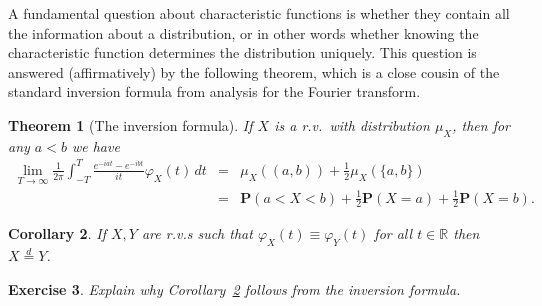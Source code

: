 \documentclass[12pt]{article}
\newtheorem{thm}{Theorem}[section]
\newtheorem{cor}[thm]{Corollary}
\newtheorem{exercise}[thm]{Exercise}
\newcommand{\R}{\mathbb{R}}
\newcommand{\prob}{\mathbf{P}}
\newcommand{\eqdist}{\stackrel{d}{=}}
\theoremstyle{example}
\begin{document}
A fundamental question about characteristic functions is whether they contain all the information about a distribution, or in other words whether knowing the characteristic function determines the distribution uniquely. This question is answered (affirmatively) by the following theorem, which is a close cousin of the standard inversion formula from analysis for the Fourier transform.

\begin{thm}[The inversion formula] \label{thm-inversion}
If $X$ is a r.v.\ with distribution $\mu_X$, then for any $a<b$ we have
\begin{eqnarray*} \lim_{T\to\infty} \frac{1}{2\pi} \int_{-T}^T \frac{e^{-iat}-e^{-ibt}}{it}\varphi_X(t)\,dt &=& \mu_X((a,b)) + \frac12 
\mu_X(\{a,b\}) \\ &=& \prob(a<X<b) + \frac12 \prob(X=a)+\frac12 \prob(X=b).
\end{eqnarray*}
\end{thm}

\begin{cor}
\label{cor:charfun-uniqueness}
If $X,Y$ are r.v.s such that $\varphi_X(t)\equiv \varphi_Y(t)$ for all $t\in\R$ then $X \eqdist Y$.
\end{cor}

\begin{exercise}
Explain why Corollary~\ref{cor:charfun-uniqueness} follows from the inversion formula.
\end{exercise}
\end{document}

